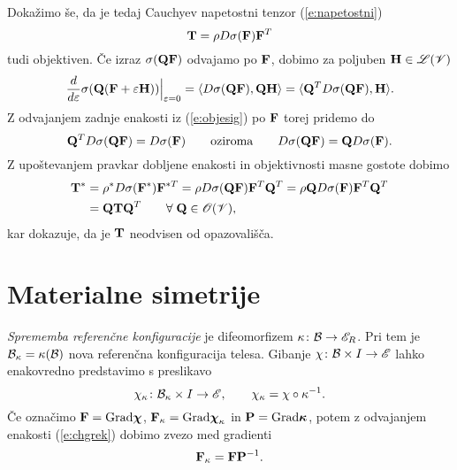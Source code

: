 Dokažimo še, da je tedaj Cauchyev napetostni tenzor (\ref{e:napetostni})
\begin{equation} \label{e:Tdrugi}
	\mathbf T=\rho D\sigma(\mathbf F)\mathbf F^T
\end{equation}
tudi objektiven. Če izraz $\sigma(\mathbf Q\mathbf F)$ odvajamo po $\mathbf F$,
dobimo za poljuben $\mathbf H\in\mathscr L(\mathscr V)$
\[
	\frac{d}{d\varepsilon}\sigma(\mathbf Q(\mathbf F+\varepsilon\mathbf H))\Big|_{\varepsilon=0}
	=\langle D\sigma(\mathbf Q\mathbf F),\mathbf Q\mathbf H\rangle=\langle\mathbf Q^T D\sigma(\mathbf Q\mathbf F),\mathbf H\rangle.
\]
Z odvajanjem zadnje enakosti iz (\ref{e:objesig}) po $\mathbf F$ torej pridemo do
\[
	\mathbf Q^T D\sigma(\mathbf Q\mathbf F) = D\sigma(\mathbf F)\qquad\textrm{oziroma}
	\qquad D\sigma(\mathbf Q\mathbf F) = \mathbf QD\sigma(\mathbf F).
\]
Z upoštevanjem pravkar dobljene enakosti in objektivnosti masne gostote dobimo
\begin{align*}
	\mathbf T^*&=\rho^* D\sigma(\mathbf F^*)\mathbf F^{*T}
	=\rho D\sigma(\mathbf Q\mathbf F)\mathbf F^{T}\mathbf Q^{T}
	=\rho \mathbf Q D\sigma(\mathbf F)\mathbf F^{T}\mathbf Q^{T} \nonumber \\
	&=\mathbf Q\mathbf T\mathbf Q^{T}\qquad\forall\;\mathbf Q\in\mathscr{O}(\mathscr V),
\end{align*}
kar dokazuje, da je $\mathbf T$ neodvisen od opazovališča.


\section{Materialne simetrije}


\emph{Sprememba referenčne konfiguracije} je difeomorfizem $\kappa\colon\mathcal B\to\mathscr E_R$.
Pri tem je $\mathcal B_{\kappa}=\kappa(\mathcal B)$ nova referenčna konfiguracija telesa. Gibanje
$\chi\colon\mathcal B\times I\to\mathscr E$ lahko enakovredno predstavimo s preslikavo
\begin{equation} \label{e:chgrek}
	\chi_{\kappa}\colon\mathcal B_{\kappa}\times I\to\mathscr E, \qquad
	\chi_{\kappa}=\chi\circ\kappa^{-1}.
\end{equation}
Če označimo $\mathbf F=\mathrm{Grad}\boldsymbol \chi$, $\mathbf F_{\kappa}=\mathrm{Grad}\boldsymbol \chi_{\kappa}$
in $\mathbf P=\mathrm{Grad}\boldsymbol \kappa$, potem z odvajanjem enakosti (\ref{e:chgrek})
dobimo zvezo med gradienti
\[
	\mathbf F_{\kappa}=\mathbf F\mathbf P^{-1}.
\]

